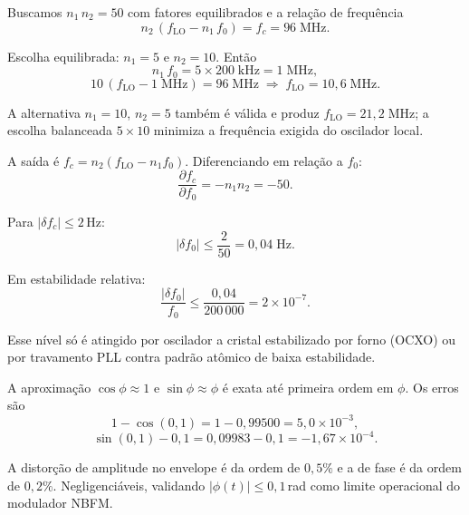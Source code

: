 \documentclass[11pt,a4paper]{article}
\begin{document}
\begin{resolucao}

Buscamos $n_1\,n_2 = 50$ com fatores equilibrados e a relação de frequência
\[
  n_2\,(f_{\text{LO}} - n_1\,f_0) = f_c = 96\;\text{MHz}.
\]

Escolha equilibrada: $n_1 = 5$ e $n_2 = 10$. Então
\[
  n_1\,f_0 = 5 \times 200\;\text{kHz} = 1\;\text{MHz},
\]
\[
  10\,(f_{\text{LO}} - 1\;\text{MHz}) = 96\;\text{MHz} \;\Rightarrow\; \boxed{f_{\text{LO}} = 10{,}6\;\text{MHz}.}
\]

A alternativa $n_1 = 10$, $n_2 = 5$ também é válida e produz $f_{\text{LO}} = 21{,}2\;\text{MHz}$; a escolha balanceada $5 \times 10$ minimiza a frequência exigida do oscilador local.
\end{resolucao}

\begin{resolucao}

A saída é $f_c = n_2(f_{\text{LO}} - n_1 f_0)$. Diferenciando em relação a $f_0$:
\[
  \frac{\partial f_c}{\partial f_0} = -n_1 n_2 = -50.
\]

Para $|\delta f_c| \le 2$\,Hz:
\[
  |\delta f_0| \le \frac{2}{50} = 0{,}04\;\text{Hz}.
\]

Em estabilidade relativa:
\[
  \frac{|\delta f_0|}{f_0} \le \frac{0{,}04}{200{\,}000} = 2 \times 10^{-7}.
\]

Esse nível só é atingido por oscilador a cristal estabilizado por forno (OCXO) ou por travamento PLL contra padrão atômico de baixa estabilidade.
\end{resolucao}

\begin{resolucao}

A aproximação $\cos\phi \approx 1$ e $\sin\phi \approx \phi$ é exata até primeira ordem em $\phi$. Os erros são
\[
  1 - \cos(0{,}1) = 1 - 0{,}99500 = 5{,}0 \times 10^{-3},
\]
\[
  \sin(0{,}1) - 0{,}1 = 0{,}09983 - 0{,}1 = -1{,}67 \times 10^{-4}.
\]

A distorção de amplitude no envelope é da ordem de $0{,}5\%$ e a de fase é da ordem de $0{,}2\%$. Negligenciáveis, validando $|\phi(t)| \le 0{,}1$\,rad como limite operacional do modulador NBFM.
\end{resolucao}
\end{document}
